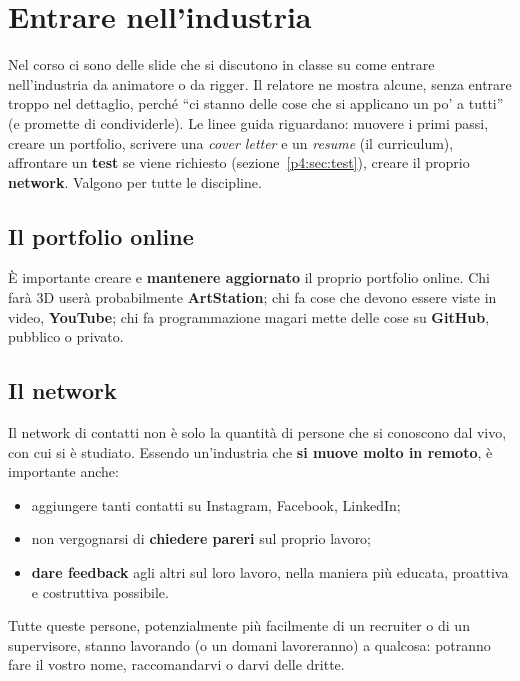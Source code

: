 \section{Entrare nell'industria}
\label{p4:sec:industria}

Nel corso ci sono delle slide che si discutono in classe su come entrare
nell'industria da animatore o da rigger. Il relatore ne mostra alcune, senza
entrare troppo nel dettaglio, perché ``ci stanno delle cose che si applicano
un po' a tutti'' (e promette di condividerle). Le linee guida riguardano:
muovere i primi passi, creare un portfolio, scrivere una \emph{cover letter}
e un \emph{resume} (il curriculum), affrontare un \textbf{test} se viene
richiesto (sezione~\ref{p4:sec:test}), creare il proprio \textbf{network}.
Valgono per tutte le discipline.

\subsection{Il portfolio online}

È importante creare e \textbf{mantenere aggiornato} il proprio portfolio
online. Chi farà 3D userà probabilmente \textbf{ArtStation}; chi fa cose che
devono essere viste in video, \textbf{YouTube}; chi fa programmazione magari
mette delle cose su \textbf{GitHub}, pubblico o privato.

\subsection{Il network}

Il network di contatti non è solo la quantità di persone che si conoscono dal
vivo, con cui si è studiato. Essendo un'industria che \textbf{si muove molto
in remoto}, è importante anche:
\begin{itemize}
  \item aggiungere tanti contatti su Instagram, Facebook, LinkedIn;
  \item non vergognarsi di \textbf{chiedere pareri} sul proprio lavoro;
  \item \textbf{dare feedback} agli altri sul loro lavoro, nella maniera più
        educata, proattiva e costruttiva possibile.
\end{itemize}
Tutte queste persone, potenzialmente più facilmente di un recruiter o di un
supervisore, stanno lavorando (o un domani lavoreranno) a qualcosa: potranno
fare il vostro nome, raccomandarvi o darvi delle dritte.

